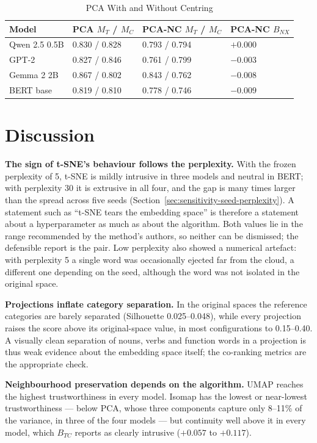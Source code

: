 \documentclass[conference,a4paper]{IEEEtran}
\begin{document}
\begin{table}[tp]
\centering
\caption{PCA With and Without Centring}\label{tab:ablation}
\footnotesize
\begin{tabular*}{\textwidth}{@{\extracolsep{\fill}}llll@{}}
\toprule
Model & PCA $M_T$ / $M_C$ & PCA-NC $M_T$ / $M_C$ & PCA-NC $B_{NX}$ \\
\midrule
Qwen 2.5 0.5B & 0.830 / 0.828 & 0.793 / 0.794 & $+0.000$ \\
GPT-2 & 0.827 / 0.846 & 0.761 / 0.799 & $-0.003$ \\
Gemma 2 2B & 0.867 / 0.802 & 0.843 / 0.762 & $-0.008$ \\
BERT base & 0.819 / 0.810 & 0.778 / 0.746 & $-0.009$ \\
\bottomrule
\end{tabular*}
\end{table}

\section{Discussion}\label{sec:discussion}

\textbf{The sign of t-SNE's behaviour follows the perplexity.} With the
frozen perplexity of 5, t-SNE is mildly intrusive in three models and
neutral in BERT; with perplexity 30 it is extrusive in all four, and the
gap is many times larger than the spread across five seeds
(Section~\ref{sec:sensitivity-seed-perplexity}). A statement such as ``t-SNE tears the embedding
space'' is therefore a statement about a hyperparameter as much as about
the algorithm. Both values lie in the range recommended by the method's
authors, so neither can be dismissed; the defensible report is the pair.
Low perplexity also showed a numerical artefact: with perplexity 5 a
single word was occasionally ejected far from the cloud, a different one
depending on the seed, although the word was not isolated in the
original space.

\textbf{Projections inflate category separation.} In the original spaces
the reference categories are barely separated (Silhouette 0.025--0.048),
while every projection raises the score above its original-space value,
in most configurations to 0.15--0.40. A visually clean separation of
nouns, verbs and function words in a projection is thus weak evidence
about the embedding space itself; the co-ranking metrics are the
appropriate check.

\textbf{Neighbourhood preservation depends on the algorithm.} UMAP
reaches the highest trustworthiness in every model. Isomap has the
lowest or near-lowest trustworthiness --- below PCA, whose three
components capture only 8--11\% of the variance, in three of the four
models --- but continuity well above it in every model, which \(B_{TC}\)
reports as clearly intrusive (\(+0.057\) to \(+0.117\)).
\end{document}
